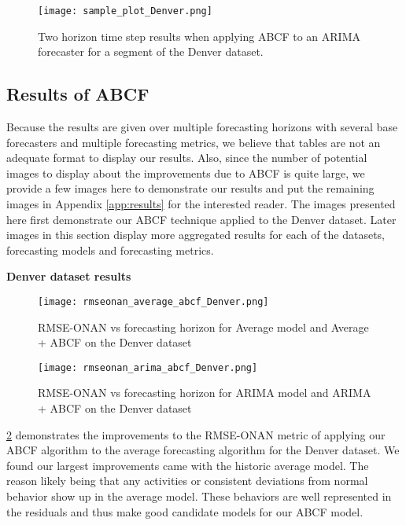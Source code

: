 \begin{figure}[!h]
	\begin{center}
		\texttt{[image: sample\_plot\_Denver.png]}
	\end{center}
	\caption{Two horizon time step results when applying ABCF to an ARIMA forecaster for a segment of the Denver dataset.}
	\label{fig:sample_abcf_denver}
\end{figure}


\subsection{Results of ABCF}
Because the results are given over multiple forecasting horizons with several base forecasters and multiple forecasting metrics, we believe that tables are not an adequate format to display our results.  Also, since the number of potential images to display about the improvements due to ABCF is quite large, we provide a few images here to demonstrate our results and put the remaining images in Appendix \ref{app:results} for the interested reader.  The images presented here first demonstrate our ABCF technique applied to the Denver dataset.  Later images in this section display more aggregated results for each of the datasets, forecasting models and forecasting metrics.

\bigskip
\noindent \textbf{Denver dataset results} 

\begin{figure}[p]
	\begin{center}
		\texttt{[image: rmseonan\_average\_abcf\_Denver.png]}
	\end{center}
	\caption{RMSE-ONAN vs forecasting horizon for Average model and Average + ABCF on the Denver dataset}
	\label{fig:average_abcf_rmseonan_denver}
\end{figure}

\begin{figure}[p]
	\begin{center}
		\texttt{[image: rmseonan\_arima\_abcf\_Denver.png]}
	\end{center}
	\caption{RMSE-ONAN vs forecasting horizon for ARIMA model and ARIMA + ABCF on the Denver dataset}
	\label{fig:arima_abcf_rmseonan_denver}
\end{figure}


\ref{fig:average_abcf_rmseonan_denver} demonstrates the improvements to the RMSE-ONAN metric of applying our ABCF algorithm to the average forecasting algorithm for the Denver dataset.  We found our largest improvements came with the historic average model.  The reason likely being that any activities or consistent deviations from normal behavior show up in the average model.  These behaviors are well represented in the residuals and thus make good candidate models for our ABCF model.


